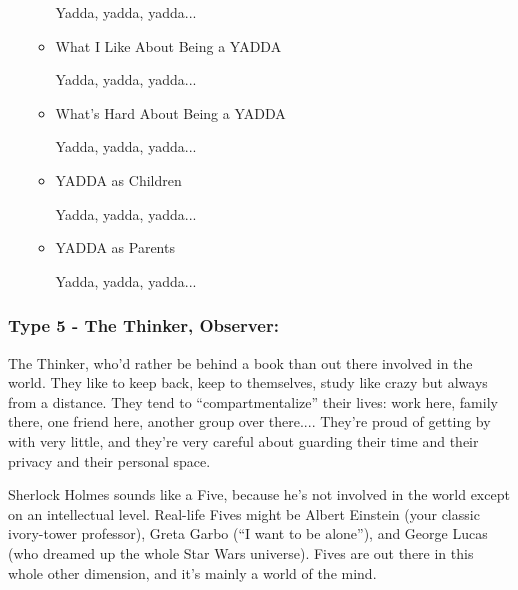 \documentclass[openleft,oneside,showtrims]{memoir}
\begin{document}
\begin{itemize}
\begin{itemize}
Yadda, yadda, yadda...

\item What I Like About Being a YADDA
\label{sec:orgce59aaa}

Yadda, yadda, yadda...

\item What's Hard About Being a YADDA
\label{sec:org3f2723f}

Yadda, yadda, yadda...

\item YADDA as Children
\label{sec:orga8fdf25}

Yadda, yadda, yadda...

\item YADDA as Parents
\label{sec:org56f349e}

Yadda, yadda, yadda...
\end{itemize}
\end{itemize}

\subsubsection*{Type 5 - The Thinker, Observer:}
\label{sec:org6974b50}

The Thinker, who'd rather be behind a book than out there involved in the world. They like to keep back, keep to themselves, study like crazy but always from a distance. They tend to ``compartmentalize'' their lives: work here, family there, one friend here, another group over there.... They're proud of getting by with very little, and they're very careful about guarding their time and their privacy and their personal space.

Sherlock Holmes sounds like a Five, because he's not involved in the world except on an intellectual level. Real-life Fives might be Albert Einstein (your classic ivory-tower professor), Greta Garbo (``I want to be alone''), and George Lucas (who dreamed up the whole Star Wars universe). Fives are out there in this whole other dimension, and it's mainly a 
world of the mind.
\end{document}
